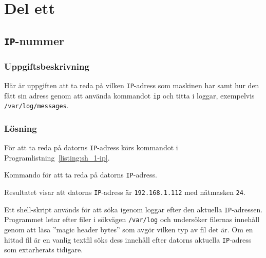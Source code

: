 %
%
%


\section{Del ett}


\subsection{\texttt{IP}-nummer}
\subsubsection{Uppgiftsbeskrivning}
Här är uppgiften att ta reda på vilken \texttt{IP}-adress som maskinen har samt
hur den fått sin adress genom att använda kommandot \texttt{ip} och titta i
loggar, exempelvis \texttt{/var/log/messages}.


\subsubsection{Lösning}
För att ta reda på datorns \texttt{IP}-adress körs kommandot i
Programlistning~\ref{listing:sh_1-ip}.

\begin{listing}[H]
\caption{Kommando för att ta reda på datorns \texttt{IP}-adress.}
\label{listing:sh_1-ip}
\end{listing}

Resultatet visar att datorns \texttt{IP}-adress är \texttt{192.168.1.112} 
med nätmasken \texttt{24}.

Ett shell-skript används för att söka igenom loggar efter den aktuella
\texttt{IP}-adressen. Programmet letar efter filer i sökvägen \texttt{/var/log}
och undersöker filernas innehåll genom att läsa ''magic header bytes'' som
avgör vilken typ av fil det är. Om en hittad fil är en vanlig textfil söks dess
innehåll efter datorns aktuella \texttt{IP}-adress som extarherats tidigare.

